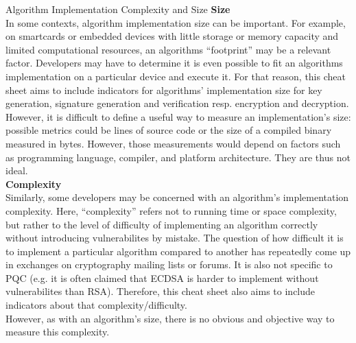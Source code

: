 

\vspace{-5mm}
\begin{algorithmbox}{Algorithm Implementation Complexity and Size \tbd}
	\scriptsize
	{\bfseries Size}\\[\baselineskip]
	In some contexts, algorithm implementation size can be important. For example, on smartcards or embedded devices with little storage or memory capacity and limited computational resources, an algorithms ``footprint'' may be a relevant factor. Developers may have to determine it is even possible to fit an algorithms implementation on a particular device and execute it. For that reason, this cheat sheet aims to include indicators for algorithms' implementation size for key generation, signature generation and verification resp. encryption and decryption.\\[\baselineskip]

	However, it is difficult to define a useful way to measure an implementation's size: possible metrics could be lines of source code or the size of a compiled binary measured in bytes. However, those measurements would depend on factors such as programming language, compiler, and platform architecture. They are thus not ideal.\\[2\baselineskip]


	{\bfseries Complexity}\\[\baselineskip]
	Similarly, some developers may be concerned with an algorithm's implementation complexity. Here, ``complexity'' refers not to running time or space complexity, but rather to the level of difficulty of implementing an algorithm correctly without introducing vulnerabilites by mistake. The question of how difficult it is to implement a particular algorithm compared to another has repeatedly come up in exchanges on cryptography mailing lists or forums. It is also not specific to PQC (e.g. it is often claimed that ECDSA is harder to implement without vulnerabilites than RSA). Therefore, this cheat sheet also aims to include indicators about that complexity/difficulty.\\[\baselineskip]

	However, as with an algorithm's size, there is no obvious and objective way to measure this complexity.\\[3\baselineskip]


\end{algorithmbox}

